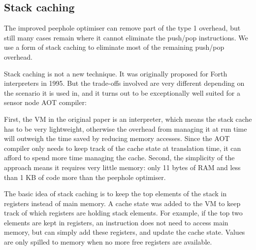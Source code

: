 
\subsection{Stack caching}
\label{sec-optimisations-simple-stack-caching}


The improved peephole optimiser can remove part of the type 1 overhead, but still many cases remain where it cannot eliminate the push/pop instructions. We use a form of stack caching \cite{Ertl:1995dv} to eliminate most of the remaining push/pop overhead.

Stack caching is not a new technique. It was originally proposed for Forth interpreters in 1995. But the trade-offs involved are very different depending on the scenario it is used in, and it turns out to be exceptionally well suited for a sensor node AOT compiler:

First, the VM in the original paper is an interpreter, which means the stack cache has to be very lightweight, otherwise the overhead from managing it at run time will outweigh the time saved by reducing memory accesses. Since the AOT compiler only needs to keep track of the cache state at translation time, it can afford to spend more time managing the cache. Second, the simplicity of the approach means it requires very little memory: only 11 bytes of RAM and less than 1 KB of code more than the peephole optimiser.

The basic idea of stack caching is to keep the top elements of the stack in registers instead of main memory. A cache state was added to the VM to keep track of which registers are holding stack elements. For example, if the top two elements are kept in registers, an  instruction does not need to access main memory, but can simply add these registers, and update the cache state. Values are only spilled to memory when no more free registers are available.


